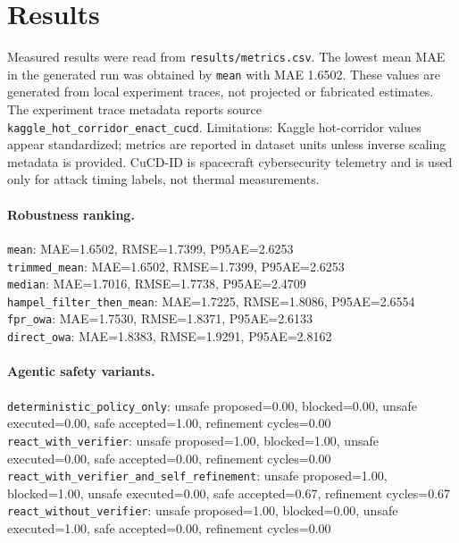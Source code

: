 \section{Results}
Measured results were read from \texttt{results/metrics.csv}. The lowest mean MAE in the generated run was obtained by \texttt{mean} with MAE 1.6502. These values are generated from local experiment traces, not projected or fabricated estimates. The experiment trace metadata reports source \texttt{kaggle_hot_corridor_enact_cucd}. Limitations: Kaggle hot-corridor values appear standardized; metrics are reported in dataset units unless inverse scaling metadata is provided. CuCD-ID is spacecraft cybersecurity telemetry and is used only for attack timing labels, not thermal measurements.

\paragraph{Robustness ranking.}
\texttt{mean}: MAE=1.6502, RMSE=1.7399, P95AE=2.6253\\
\texttt{trimmed_mean}: MAE=1.6502, RMSE=1.7399, P95AE=2.6253\\
\texttt{median}: MAE=1.7016, RMSE=1.7738, P95AE=2.4709\\
\texttt{hampel_filter_then_mean}: MAE=1.7225, RMSE=1.8086, P95AE=2.6554\\
\texttt{fpr_owa}: MAE=1.7530, RMSE=1.8371, P95AE=2.6133\\
\texttt{direct_owa}: MAE=1.8383, RMSE=1.9291, P95AE=2.8162

\paragraph{Agentic safety variants.}
\texttt{deterministic_policy_only}: unsafe proposed=0.00, blocked=0.00, unsafe executed=0.00, safe accepted=1.00, refinement cycles=0.00\\
\texttt{react_with_verifier}: unsafe proposed=1.00, blocked=1.00, unsafe executed=0.00, safe accepted=0.00, refinement cycles=0.00\\
\texttt{react_with_verifier_and_self_refinement}: unsafe proposed=1.00, blocked=1.00, unsafe executed=0.00, safe accepted=0.67, refinement cycles=0.67\\
\texttt{react_without_verifier}: unsafe proposed=1.00, blocked=0.00, unsafe executed=1.00, safe accepted=0.00, refinement cycles=0.00

